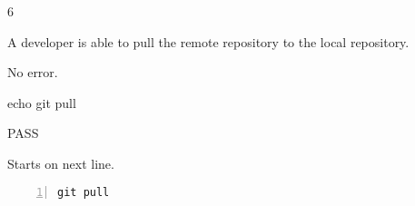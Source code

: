 \begin{description}[align=right,leftmargin=3.2cm,labelindent=3.0cm]
\item[Step:] 6
\item[Confirm:] A developer is able to pull the remote repository to the local repository.
\item[Expectation:] No error.
\item[Command:] echo git  pull
\item[Test Result:] PASS
\item[Evidence:] Starts on next line.
\end{description}
\begin{lstlisting}[numbers=left]
git pull

\end{lstlisting}

